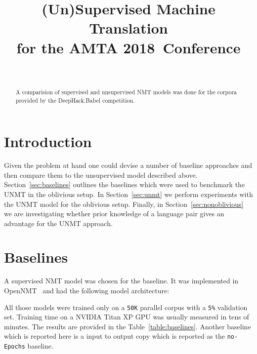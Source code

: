 \documentclass[]{article}
\newcommand{\confname}{AMTA 2018}
\begin{document}
\title{\bf (Un)Supervised Machine Translation \\
  for the \confname~Conference}  
\author{ \hfill  {}\\ 
\AND
         \hfill {}
}

\maketitle
\pagestyle{empty}

\begin{abstract}
  A comparision of supervised and unsupervised NMT models was done for the corpora provided by the DeepHack.Babel competition.
\end{abstract}

\section{Introduction}


Given the problem at hand one could devise a number of baseline approaches and then compare them to the unsupervised model described above.
Section~\ref{sec:baselines} outlines the baselines which were used to benchmark the UNMT in the oblivious setup.
In Section~\ref{sec:unmt} we perform experiments with the UNMT model for the oblivious setup.
Finally, in Section~\ref{sec:nonoblivious} we are investigating whether prior knowledge of a language pair gives an advantage for the UNMT approach.

\section{Baselines}
\label{sect:baselines}

A supervised NMT model was chosen for the baseline.
It was implemented in OpenNMT~\cite{opennmt} and had the following model architecture:


All those models were trained only on a {\tt 50K} parallel corpus with a {\tt 5\%} validation set.
Training time on a NVIDIA Titan XP GPU was usually measured in tens of minutes.
The results are provided in the Table~\ref{table:baselines}.
Another baseline which is reported here is a input to output copy which is reported as the {\tt no-Epochs} baseline.
\end{document}
